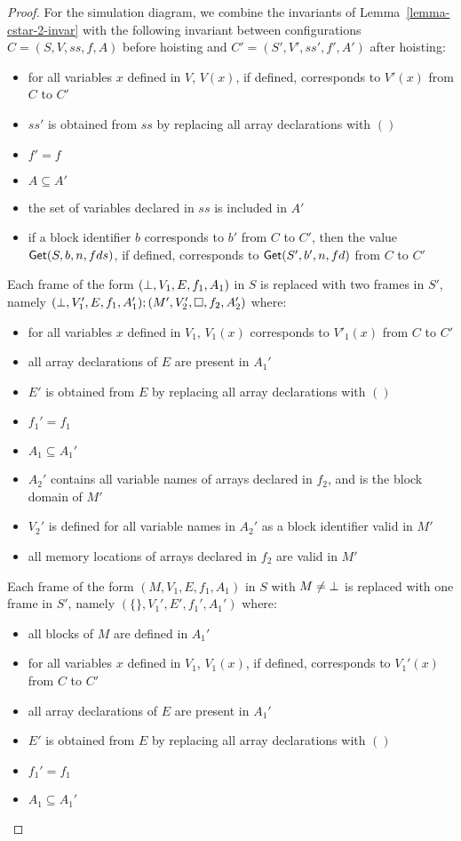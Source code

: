 \begin{proof}
  For the simulation diagram, we combine the invariants of
  Lemma~\ref{lemma-cstar-2-invar} with the following invariant between
  configurations $C = (S, V, ss, f, A)$ before hoisting and $C' = (S',
  V', ss', f', A')$ after hoisting:
  \begin{itemize}
  \item for all variables $x$ defined in $V$, $V(x)$, if defined,
    corresponds to $V'(x)$ from $C$ to $C'$
  \item $ss'$ is obtained from $ss$ by replacing all array
    declarations with $()$
  \item $f' = f$
  \item $A \subseteq A'$
  \item the set of variables declared in $ss$ is included in $A'$
  \item if a block identifier $b$ corresponds to $b'$ from $C$ to
    $C'$, then the value $\text{\textsf{Get}}(S, b, n, fds)$, if defined, corresponds
    to $\text{\textsf{Get}}(S', b', n, fd)$ from $C$ to $C'$
  \end{itemize}
  Each frame of the form $(\bot, V_1, E, f_1, A_1)$ in $S$ is
  replaced with two frames in $S'$, namely $(\bot, V_1', E, f_1,
  A_1') ; (M', V_2', \Box, f_2, A_2')$ where:
  \begin{itemize}
  \item for all variables $x$ defined in $V_1$, $V_1(x)$ corresponds to
    $V'_1(x)$ from $C$ to $C'$
  \item all array declarations of $E$ are present in $A_1'$
  \item $E'$ is obtained from $E$ by replacing all array
    declarations with $()$
  \item $f_1' = f_1$
  \item $A_1 \subseteq A_1'$
  \item $A_2'$ contains all variable names of arrays declared in
    $f_2$, and is the block domain of $M'$
  \item $V_2'$ is defined for all variable names in $A_2'$ as a block
    identifier valid in $M'$
  \item all memory locations of arrays declared in $f_2$ are valid in
    $M'$
  \end{itemize}
  Each frame of the form $(M, V_1, E, f_1, A_1)$ in $S$ with $M \not=
  \bot$ is replaced with one frame in $S'$, namely $(\{ \}, V_1', E',
  f_1', A_1')$ where:
  \begin{itemize}
  \item all blocks of $M$ are defined in $A_1'$
  \item for all variables $x$ defined in $V_1$, $V_1(x)$, if defined,
    corresponds to $V_1'(x)$ from $C$ to $C'$
  \item all array declarations of $E$ are present in $A_1'$
  \item $E'$ is obtained from $E$ by replacing all array declarations
    with $()$
  \item $f_1' = f_1$
  \item $A_1 \subseteq A_1'$
  \end{itemize}


\end{proof}
